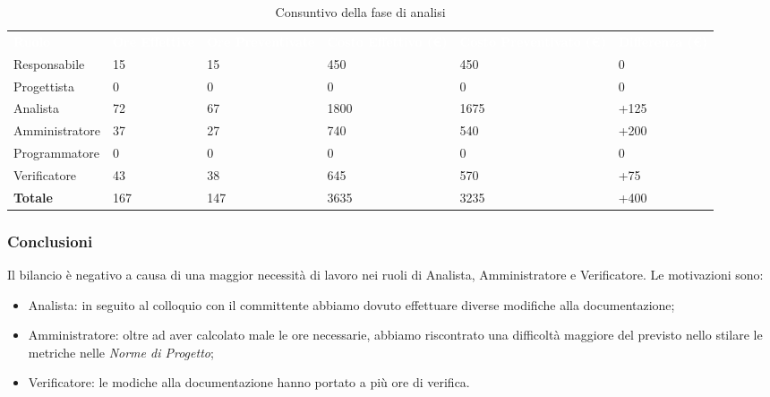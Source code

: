 \begin{table}[H]
\begin{center}
\renewcommand{\arraystretch}{1.5}
\begin{tabular}{ m{}<{\centering}  m{}<{\centering} m{}<{\centering} m{}<{\centering} m{}<{\centering} m{}<{\centering}}
	\rowcolor{darkblue}
	\textcolor{white}{\textbf{Ruolo}} & \textcolor{white}{\textbf{Ore Effettive}} & \textcolor{white}{\textbf{Ore Preventivate}}&\textcolor{white}{\textbf{Costo Effettivo (\euro) }}&\textcolor{white}{\textbf{Costo Preventivato (\euro)}}&\textcolor{white}{\textbf{Differenza (\euro)}}\\ 

	Responsabile  & 15 & 15 & 450 & 450 & 0\\	
	
	Progettista & 0 & 0 & 0 & 0 & 0\\
	
	Analista & 72 & 67 & 1800 & 1675 & +125\\
	
	Amministratore & 37 & 27 & 740 & 540 & +200\\
	
	Programmatore & 0 & 0 &0 &0 & 0\\
	
	Verificatore & 43 & 38 & 645 & 570 & +75\\
	
	\textbf{Totale} & 167 & 147 & 3635 & 3235 & +400\\
	
\end{tabular}
\caption{Consuntivo della fase di analisi}
\end{center}
\end{table}

\subsubsection{Conclusioni}
Il bilancio è negativo a causa di una maggior necessità di lavoro nei ruoli di Analista, Amministratore e Verificatore. Le motivazioni sono:
\begin{itemize}
\item Analista: in seguito al colloquio con il committente\glo{} abbiamo dovuto effettuare diverse modifiche alla documentazione;
\item Amministratore: oltre ad aver calcolato male le ore necessarie, abbiamo riscontrato una difficoltà maggiore del previsto nello stilare le metriche nelle \textit{Norme di Progetto};
\item Verificatore: le modiche alla documentazione hanno portato a più ore di verifica.
\end{itemize}

